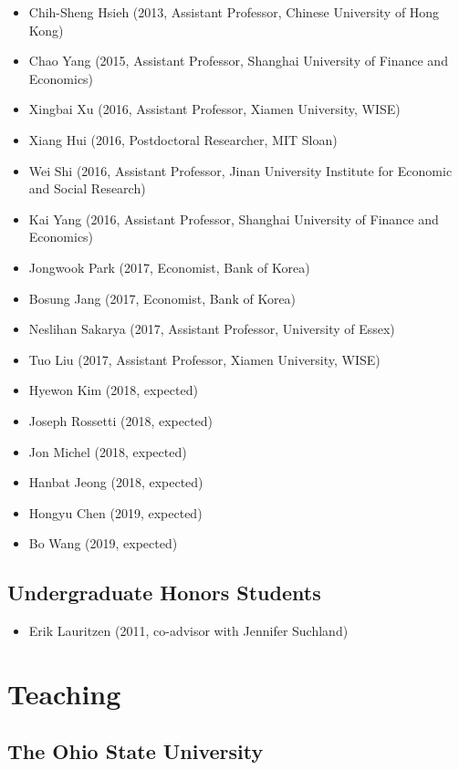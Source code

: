 \documentclass[10pt,letterpaper]{article}
\begin{document}
\begin{itemize}
\item Chih-Sheng Hsieh (2013, Assistant Professor, Chinese University of Hong Kong)
\item Chao Yang (2015, Assistant Professor, Shanghai University of Finance and Economics)
\item Xingbai Xu (2016, Assistant Professor, Xiamen University, WISE)
\item Xiang Hui (2016, Postdoctoral Researcher, MIT Sloan)
\item Wei Shi (2016, Assistant Professor, Jinan University Institute for Economic and Social Research)
\item Kai Yang (2016, Assistant Professor, Shanghai University of Finance and Economics)
\item Jongwook Park (2017, Economist, Bank of Korea)
\item Bosung Jang (2017, Economist, Bank of Korea)
\item Neslihan Sakarya (2017, Assistant Professor, University of Essex)
\item Tuo Liu (2017, Assistant Professor, Xiamen University, WISE)
\item Hyewon Kim (2018, expected)
\item Joseph Rossetti (2018, expected)
\item Jon Michel (2018, expected)
\item Hanbat Jeong (2018, expected)
\item Hongyu Chen (2019, expected)
\item Bo Wang (2019, expected)
\end{itemize}

\subsection*{Undergraduate Honors Students}

\begin{itemize}
\item Erik Lauritzen (2011, co-advisor with Jennifer Suchland)
\end{itemize}

\section*{Teaching}

\subsection*{The Ohio State University}
\end{document}
